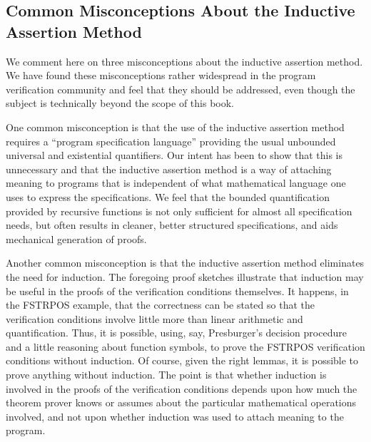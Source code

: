 \documentclass[10pt]{book}
\begin{document}
\subsection{Common Misconceptions About the Inductive Assertion Method}
We comment here on three misconceptions
about the inductive assertion method.  We have found these misconceptions
rather widespread in the program verification community and feel that
they should be addressed, even though the subject is technically
beyond the scope of this book.

One common misconception is that the use of the inductive assertion
method requires a ``program specification language'' providing the usual
unbounded universal and existential quantifiers.
Our intent has been to show that this is unnecessary
and that the inductive assertion method is a way of attaching meaning
to programs that is independent of what mathematical language one uses
to express the specifications.  We feel that the bounded quantification provided by
recursive functions is not only sufficient for almost all
specification needs, but often results in cleaner, better structured specifications,
and aids mechanical generation of proofs.

Another common misconception is that the inductive assertion
method eliminates the need for induction.  The foregoing proof
sketches illustrate that induction may be useful in the proofs
of the verification conditions themselves.  It happens, in the
FSTRPOS example, that the correctness can be stated so that the verification
conditions involve little more than linear arithmetic and quantification.
Thus, it is possible, using, say, Presburger's decision procedure \cite{PRESBURGER} and a little
reasoning about function symbols, to prove the
FSTRPOS verification conditions without induction.  Of course, given
the right lemmas, it is possible to prove anything without induction.
The point is that whether induction is involved in the proofs of
the verification conditions depends upon how much the theorem
prover knows or assumes about the particular mathematical operations
involved, and not upon whether induction was used to attach meaning
to the program.
\end{document}
